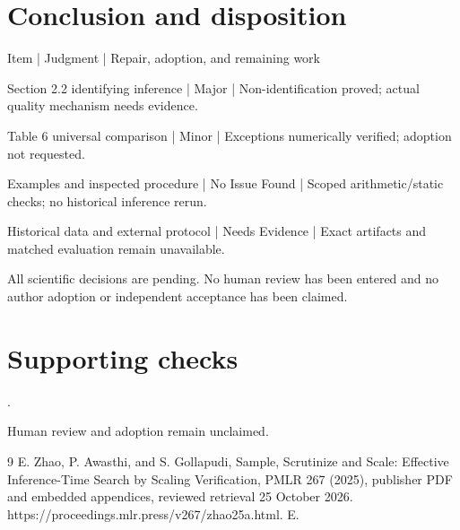 \documentclass[10pt]{article}
\begin{document}
\section*{Conclusion and disposition}
Item | Judgment | Repair, adoption, and remaining work\par
Section 2.2 identifying inference | Major | Non-identification proved; actual quality mechanism needs evidence.\par
Table 6 universal comparison | Minor | Exceptions numerically verified; adoption not requested.\par
Examples and inspected procedure | No Issue Found | Scoped arithmetic/static checks; no historical inference rerun.\par
Historical data and external protocol | Needs Evidence | Exact artifacts and matched evaluation remain unavailable.\par
All scientific decisions are pending. No human review has been entered and no author adoption or independent acceptance has been claimed.\par
\section*{Supporting checks}
.\par
Human review and adoption remain unclaimed.\par
9 E. Zhao, P. Awasthi, and S. Gollapudi, Sample, Scrutinize and Scale: Effective Inference-Time Search by Scaling Verification, PMLR 267 (2025), publisher PDF and embedded appendices, reviewed retrieval 25 October 2026. https://proceedings.mlr.press/v267/zhao25a.html. E.\par
\end{document}
